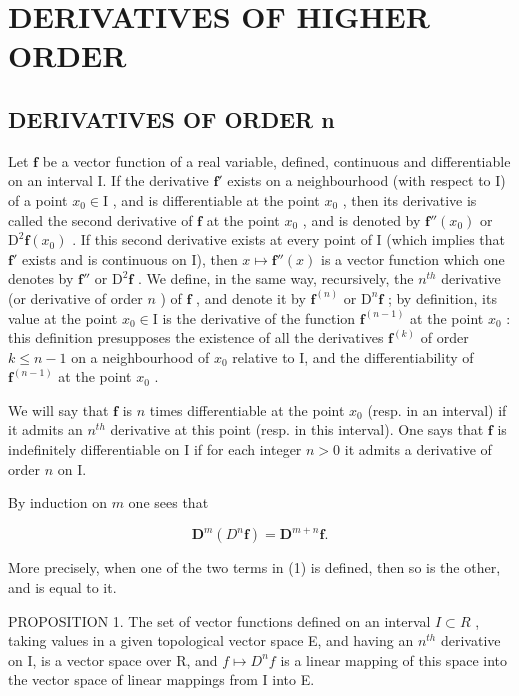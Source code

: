\section{DERIVATIVES OF HIGHER ORDER}

\subsection{DERIVATIVES OF ORDER n}

Let \(\mathbf{f}\) be a vector function of a real variable, defined, continuous and differentiable on an interval I. If the derivative \(\mathbf{f}'\) exists on a neighbourhood (with respect to I) of a point \(x_0 \in \mathrm{I}\) , and is differentiable at the point \(x_0\) , then its derivative is called the second derivative of \(\mathbf{f}\) at the point \(x_0\) , and is denoted by \(\mathbf{f}''(x_0)\) or \(\mathrm{D}^2\mathbf{f}(x_0)\) . If this second derivative exists at every point of I (which implies that \(\mathbf{f}'\) exists and is continuous on I), then \(x \mapsto \mathbf{f}''(x)\) is a vector function which one denotes by \(\mathbf{f}''\) or \(\mathrm{D}^2\mathbf{f}\) . We define, in the same way, recursively, the \(n^{th}\) derivative (or derivative of order \(n\) ) of \(\mathbf{f}\) , and denote it by \(\mathbf{f}^{(n)}\) or \(\mathrm{D}^n\mathbf{f}\) ; by definition, its value at the point \(x_0 \in \mathrm{I}\) is the derivative of the function \(\mathbf{f}^{(n-1)}\) at the point \(x_0\) : this definition presupposes the existence of all the derivatives \(\mathbf{f}^{(k)}\) of order \(k \leqslant n - 1\) on a neighbourhood of \(x_0\) relative to I, and the differentiability of \(\mathbf{f}^{(n-1)}\) at the point \(x_0\) .

We will say that \(\mathbf{f}\) is \(n\) times differentiable at the point \(x_0\) (resp. in an interval) if it admits an \(n^{th}\) derivative at this point (resp. in this interval). One says that \(\mathbf{f}\) is indefinitely differentiable on I if for each integer \(n > 0\) it admits a derivative of order \(n\) on I.

By induction on \(m\) one sees that

\[
\mathbf {D} ^ {m} (D ^ {n} \mathbf {f}) = \mathbf {D} ^ {m + n} \mathbf {f}.\tag{1}
\]

More precisely, when one of the two terms in (1) is defined, then so is the other, and is equal to it.

PROPOSITION 1. The set of vector functions defined on an interval \(I \subset R\) , taking values in a given topological vector space E, and having an \(n^{th}\) derivative on I, is a vector space over R, and \(f \mapsto D^{n}f\) is a linear mapping of this space into the vector space of linear mappings from I into E.


